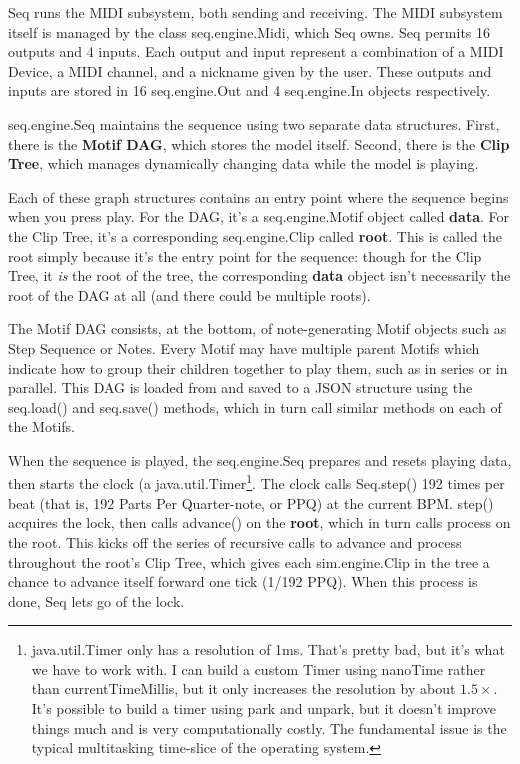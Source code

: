 \documentclass[twoside,10pt]{article}
\newcommand\bump{\vspace{10in}}
\begin{document}
Seq runs the MIDI subsystem, both sending and receiving.  The MIDI subsystem itself is managed by the class {\sf seq.engine.Midi}, which Seq owns.  Seq permits 16 outputs and 4 inputs.  Each output and input represent a combination of a MIDI Device, a MIDI channel, and a nickname given by the user.  These outputs and inputs are stored in 16 {\sf seq.engine.Out} and 4 {\sf seq.engine.In} objects respectively.

{\sf seq.engine.Seq} maintains the sequence using two separate data structures.  First, there is the {\bf Motif DAG}, which stores the model itself.  Second, there is the {\bf Clip Tree}, which manages dynamically changing data while the model is playing.  

Each of these graph structures contains an entry point where the sequence begins when you press play.  For the DAG, it's a {\sf seq.engine.Motif} object called {\bf data}.  For the Clip Tree, it's a corresponding {\sf seq.engine.Clip} called {\bf root}.  This is called the root simply because it's the entry point for the sequence: though for the Clip Tree, it {\it is} the root of the tree, the corresponding {\bf data} object isn't necessarily the root of the DAG at all (and there could be multiple roots).

The Motif DAG consists, at the bottom, of note-generating Motif objects such as Step Sequence or Notes.  Every Motif may have multiple parent Motifs which indicate how to group their children together to play them, such as in series or in parallel.  This DAG is loaded from and saved to a JSON structure using the {\sf seq.load()} and {\sf seq.save()} methods, which in turn call similar methods on each of the Motifs.

\bump

When the sequence is played, the {\sf seq.engine.Seq} prepares and resets playing data, then starts the clock (a {\sf java.util.Timer}\footnote{{\sf java.util.Timer} only has a resolution of 1ms.  That's pretty bad, but it's what we have to work with.  I can build a custom Timer using nanoTime rather than currentTimeMillis, but it only increases the resolution by about \(1.5\times\).  It's possible to build a timer using park and unpark, but it doesn't improve things much and is very computationally costly.  The fundamental issue is the typical multitasking time-slice of the operating system.}.  The clock calls {\sf Seq.step()} 192 times per beat (that is, 192 Parts Per Quarter-note, or PPQ) at the current BPM. {\sf step()} acquires the lock, then calls {\sf advance()} on the {\bf root}, which in turn calls {\sf process} on the root.  This kicks off the series of recursive calls to {\sf advance} and {\sf process} throughout the root's Clip Tree, which gives each {\sf sim.engine.Clip} in the tree a chance to advance itself forward one tick (1/192 PPQ).  When this process is done, Seq lets go of the lock.
\end{document}
